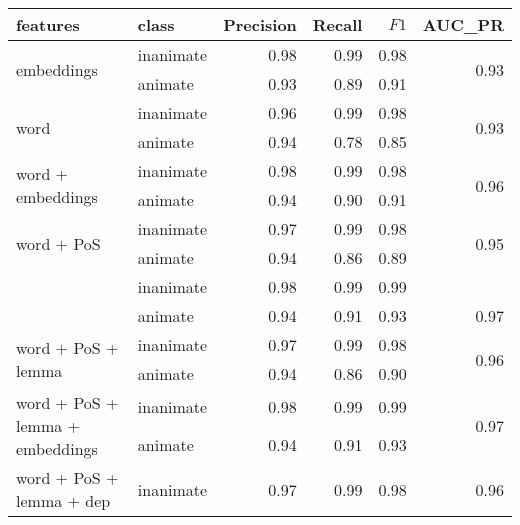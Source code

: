 \documentclass[a4paper,UKenglish]{oasics}
\begin{document}
\begin{table}
\centering
\begin{tabular}{llrrrr}
\toprule
features & class & Precision &  Recall & $F1$ &  AUC_{PR} \\
\midrule
\multirow{2}{*}{embeddings}                            & inanimate     &       0.98 &    0.99 &    0.98 & \multirow{2}{*}{0.93} \\
                                                       & animate     &       0.93 &    0.89 &    0.91 &  \\
\multirow{2}{*}{word}                                  & inanimate     &       0.96 &    0.99 &    0.98 & \multirow{2}{*}{0.93} \\
                                                       & animate     &       0.94 &    0.78 &    0.85 &  \\
\multirow{2}{*}{word + embeddings}                     & inanimate     &       0.98 &    0.99 &    0.98 & \multirow{2}{*}{0.96} \\
                                                       & animate     &       0.94 &    0.90 &    0.91 &  \\
\multirow{2}{*}{word + PoS}                            & inanimate     &       0.97 &    0.99 &    0.98 & \multirow{2}{*}{0.95} \\
                                                       & animate     &       0.94 &    0.86 &    0.89 &  \\
\rowcolor{Gray}                                        & inanimate     &       0.98 &    0.99 &    0.99 &  \\
\rowcolor{Gray}\multirow{-2}{*}{word + PoS + embeddings}   & animate     &       0.94 &    0.91 &    0.93 & \multirow{-2}{*}{0.97} \\
\multirow{2}{*}{word + PoS + lemma}                    & inanimate    &       0.97 &    0.99 &    0.98 & \multirow{2}{*}{0.96} \\
                                                       & animate     &       0.94 &    0.86 &    0.90 &  \\
\multirow{2}{*}{word + PoS + lemma + embeddings}       & inanimate     &       0.98 &    0.99 &    0.99 & \multirow{2}{*}{0.97} \\
                                                       & animate     &       0.94 &    0.91 &    0.93 &  \\
\multirow{2}{*}{word + PoS + lemma + dep}              & inanimate     &       0.97 &    0.99 &    0.98 & \multirow{2}{*}{0.96} \\

\end{tabular}
\end{table}
\end{document}
